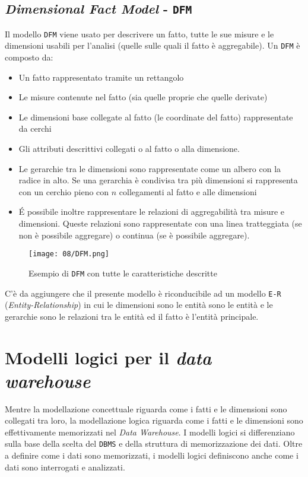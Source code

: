     \subsection{\textit{Dimensional Fact Model} - \texttt{DFM}}
        Il modello \texttt{DFM} viene usato per descrivere un fatto, tutte le sue misure e le dimensioni usabili per l'analisi (quelle sulle quali il fatto è aggregabile). Un \texttt{DFM} è composto da:
        \begin{itemize}
            \item Un fatto rappresentato tramite un rettangolo
            \item Le misure contenute nel fatto (sia quelle proprie che quelle derivate)
            \item Le dimensioni base collegate al fatto (le coordinate del fatto) rappresentate da cerchi
            \item Gli attributi descrittivi collegati o al fatto o alla dimensione.
            \item Le gerarchie tra le dimensioni sono rappresentate come un albero con la radice in alto.
                \subitem Se una gerarchia è condivisa tra più dimensioni si rappresenta con un cerchio pieno con $n$ collegamenti al fatto e alle dimensioni
            \item É possibile inoltre rappresentare le relazioni di aggregabilità tra misure e dimensioni. Queste relazioni sono rappresentate con una linea tratteggiata (se non è possibile aggregare) o continua (se è possibile aggregare).
        \end{itemize}
        \begin{figure}[H]
            \centering
            \texttt{[image: 08/DFM.png]}
            \caption{Esempio di \texttt{DFM} con tutte le caratteristiche descritte}
        \end{figure}
        C'è da aggiungere che il presente modello è riconducibile ad un modello \texttt{E-R} (\textit{Entity-Relationship}) in cui le dimensioni sono le entità sono le entità e le gerarchie sono le relazioni tra le entità ed il fatto è l'entità principale.
\section{Modelli logici per il \textit{data warehouse}}
    Mentre la modellazione concettuale riguarda come i fatti e le dimensioni sono collegati tra loro, la modellazione logica riguarda come i fatti e le dimensioni sono effettivamente memorizzati nel \textit{Data Warehouse}. I modelli logici si differenziano sulla base della scelta del \texttt{DBMS} e della struttura di memorizzazione dei dati. Oltre a definire come i dati sono memorizzati, i modelli logici definiscono anche come i dati sono interrogati e analizzati.
